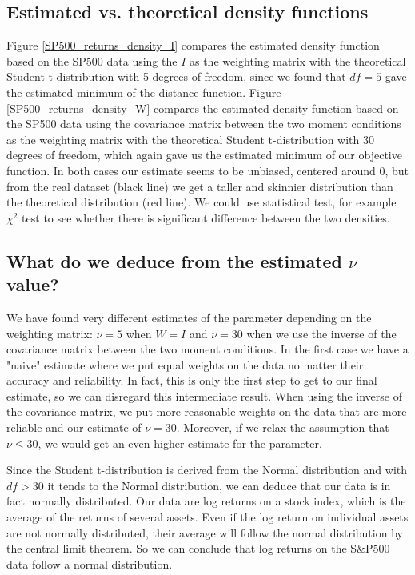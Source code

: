 \subsection{Estimated vs. theoretical density functions}
Figure \ref{SP500_returns_density_I} compares the estimated density function based on the SP500 data using the $I$ as the weighting matrix with the theoretical Student t-distribution with 5 degrees of freedom, since we found that $df=5$ gave the estimated minimum of the distance function. Figure \ref{SP500_returns_density_W} compares the estimated density function based on the SP500 data using the covariance matrix between the two moment conditions as the weighting matrix with the theoretical Student t-distribution with 30 degrees of freedom, which again gave us the estimated minimum of our objective function. In both cases our estimate seems to be unbiased, centered around 0, but from the real dataset (black line) we get a taller and skinnier distribution than the theoretical distribution (red line). We could use statistical test, for example $\chi^2$ test to see whether there is significant difference between the two densities. 

\subsection{What do we deduce from the estimated $\nu$ value?}
We have found very different estimates of the parameter depending on the weighting matrix: $\nu=5$ when $W=I$ and $\nu=30$ when we use the inverse of the covariance matrix between the two moment conditions. In the first case we have a "naive" estimate where we put equal weights on the data no matter their accuracy and reliability. In fact, this is only the first step to get to our final estimate, so we can disregard this intermediate result. When using the inverse of the covariance matrix, we put more reasonable weights on the data that are more reliable and our estimate of $\nu=30$. Moreover, if we relax the assumption that $\nu\leq 30$, we would get an even higher estimate for the parameter. 

Since the Student t-distribution is derived from the Normal distribution and with $df>30$ it tends to the Normal distribution, we can deduce that our data is in fact normally distributed. Our data are log returns on a stock index, which is the average of the returns of several assets. Even if the log return on individual assets are not normally distributed, their average will follow the normal distribution by the central limit theorem. So we can conclude that log returns on the S\&P500 data follow a normal distribution.       


